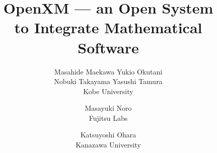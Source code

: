 \documentclass[notitlepage]{book}
\begin{document}
\date{}
\title{OpenXM 
      --- an Open System \\ to Integrate Mathematical Software}
\author{
{\hfil}
\and
{Masahide Maekawa \quad Yukio Okutani}\\
{Nobuki Takayama \quad Yasushi Tamura}\\
Kobe University
\and
{\hfil}
\and
{Masayuki Noro}\\
{Fujitsu Labs}
\and
{Katsuyoshi Ohara}\\
{Kanazawa University}
}
\maketitle


\end{document}
